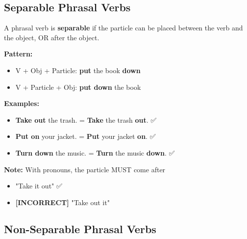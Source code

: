 \subsection{Separable Phrasal Verbs}

\begin{grammarbox}[title=Separable (Transitive) Phrasal Verbs]
A phrasal verb is \textbf{separable} if the particle can be placed between the verb and the object, OR after the object.

\textbf{Pattern:}
\begin{itemize}
    \item V + Obj + Particle: \textbf{put} the book \textbf{down}
    \item V + Particle + Obj: \textbf{put down} the book
\end{itemize}

\textbf{Examples:}
\begin{itemize}
    \item \textbf{Take out} the trash. = \textbf{Take} the trash \textbf{out}. ✅
    \item \textbf{Put on} your jacket. = \textbf{Put} your jacket \textbf{on}. ✅
    \item \textbf{Turn down} the music. = \textbf{Turn} the music \textbf{down}. ✅
\end{itemize}

\textbf{Note:} With pronouns, the particle MUST come after
\begin{itemize}
    \item "Take it out" ✅
    \item \textbf{[INCORRECT]} "Take out it"
\end{itemize}
\end{grammarbox}

\subsection{Non-Separable Phrasal Verbs}

